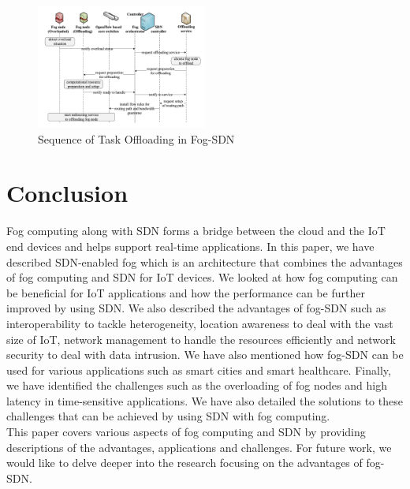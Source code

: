 \documentclass[conference]{IEEEtran}
\begin{document}
\begin{figure}[h]
    \centering
    \includegraphics[width=0.5\textwidth]{Images/task_offloading.png}
    \caption{Sequence of Task Offloading in Fog-SDN}
    \label{fig:task offloading}
\end{figure}

\section{Conclusion}
Fog computing along with SDN forms a bridge between the cloud and the IoT end devices and helps support real-time applications. In this paper, we have described SDN-enabled fog which is an architecture that combines the advantages of fog computing and SDN for IoT devices. We looked at how fog computing can be beneficial for IoT applications and how the performance can be further improved by using SDN. We also described the advantages of fog-SDN such as interoperability to tackle heterogeneity, location awareness to deal with the vast size of IoT, network management to handle the resources efficiently and network security to deal with data intrusion. We have also mentioned how fog-SDN can be used for various applications such as smart cities and smart healthcare. Finally, we have identified the challenges such as the overloading of fog nodes and high latency in time-sensitive applications. We have also detailed the solutions to these challenges that can be achieved by using SDN with fog computing. 
\\

This paper covers various aspects of fog computing and SDN by providing descriptions of the advantages, applications and challenges. For future work, we would like to delve deeper into the research focusing on the advantages of fog-SDN.
\end{document}
